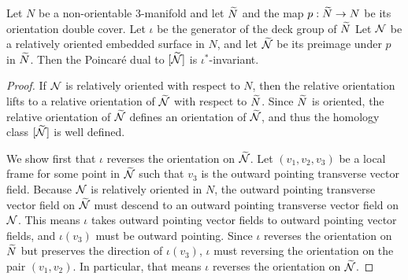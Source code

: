 \begin{lem}
  \label{lem:PD1}
  Let $N$ be a non-orientable 3-manifold and let $\widetilde{N}$ and the map $p:\widetilde{N}\to N$ be its orientation double cover.  Let $\iota$ be the generator of the deck group of $\widetilde{N}$
  Let $\mathcal{N}$ be a relatively oriented embedded surface in $N$, and let $\widetilde{\mathcal{N}}$ be its preimage under $p$ in $\widetilde{N}$.
  Then the Poincar\'e dual to $[\widetilde{\mathcal{N}}]$ is $\iota^{\ast}$-invariant.
\end{lem}
\begin{proof}
  If $\mathcal{N}$ is relatively oriented with respect to $N$, then the relative orientation lifts to a relative orientation of $\widetilde{\mathcal{N}}$ with respect to $\widetilde{N}$.
  Since $\widetilde{N}$ is oriented, the relative orientation of $\widetilde{\mathcal{N}}$ defines an orientation of $\widetilde{\mathcal{N}}$, and thus the homology class $[\widetilde{\mathcal{N}}]$ is well defined.

  We show first that $\iota$ reverses the orientation on $\widetilde{\mathcal{N}}$.
  Let $(v_1, v_2, v_3)$ be a local frame for some point in $\widetilde{\mathcal{N}}$ such that
  $v_3$ is the outward pointing transverse vector field.
  Because $\mathcal{N}$ is relatively oriented in $N$, the outward pointing transverse vector field on $\widetilde{\mathcal{N}}$ must descend to an outward pointing transverse vector field on $\mathcal{N}$.
  This means $\iota$ takes outward pointing vector fields to outward pointing vector fields, and $\iota(v_3)$ must be outward pointing.
  Since $\iota$ reverses the orientation on $\widetilde{N}$ but preserves the direction of $\iota(v_3)$, $\iota$ must reversing the orientation on the pair $(v_1, v_2)$.
  In particular, that means $\iota$ reverses the orientation on $\widetilde{\mathcal{N}}$.


\end{proof}
